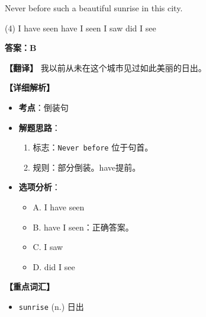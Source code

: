 \documentclass[11pt, a4paper]{article}
\newcommand{\analysis}[4]{
    \begin{solutionbox}
        \textbf{答案：#1}
        
        \textbf{【翻译】} #2
        
        \textbf{【详细解析】}
        #3
        
        \textbf{【重点词汇】}
        #4
    \end{solutionbox}
}
\newcommand{\blank}{\underline{\hspace{1.5cm}}}
\begin{document}
\begin{questions}
    \item Never before \blank such a beautiful sunrise in this city.
    \begin{tasks}(4)
        \task I have seen \task have I seen \task I saw \task did I see
    \end{tasks}
    \analysis{B}{我以前从未在这个城市见过如此美丽的日出。}{
        \begin{itemize}
            \item \textbf{考点}：倒装句
            \item \textbf{解题思路}：
                \begin{enumerate}
                    \item 标志：\texttt{Never before} 位于句首。
                    \item 规则：部分倒装。have提前。
                \end{enumerate}
            \item \textbf{选项分析}：
                \begin{itemize}
                    \item A. I have seen
                    \item B. have I seen：正确答案。
                    \item C. I saw
                    \item D. did I see
                \end{itemize}
        \end{itemize}
    }{
        \begin{itemize}
            \item \texttt{sunrise} (n.) 日出
        \end{itemize}
    }


\end{questions}
\end{document}
